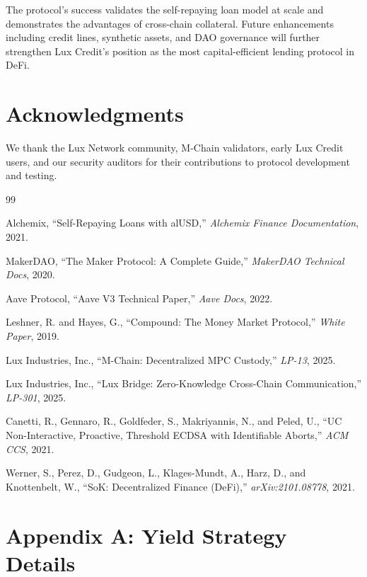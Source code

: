 \documentclass[11pt,a4paper]{article}
\begin{document}
The protocol's success validates the self-repaying loan model at scale and demonstrates the advantages of cross-chain collateral. Future enhancements including credit lines, synthetic assets, and DAO governance will further strengthen Lux Credit's position as the most capital-efficient lending protocol in DeFi.

\section*{Acknowledgments}

We thank the Lux Network community, M-Chain validators, early Lux Credit users, and our security auditors for their contributions to protocol development and testing.


\begin{thebibliography}{99}

Alchemix, ``Self-Repaying Loans with alUSD,'' \textit{Alchemix Finance Documentation}, 2021.

MakerDAO, ``The Maker Protocol: A Complete Guide,'' \textit{MakerDAO Technical Docs}, 2020.

Aave Protocol, ``Aave V3 Technical Paper,'' \textit{Aave Docs}, 2022.

Leshner, R. and Hayes, G., ``Compound: The Money Market Protocol,'' \textit{White Paper}, 2019.

Lux Industries, Inc., ``M-Chain: Decentralized MPC Custody,'' \textit{LP-13}, 2025.

Lux Industries, Inc., ``Lux Bridge: Zero-Knowledge Cross-Chain Communication,'' \textit{LP-301}, 2025.

Canetti, R., Gennaro, R., Goldfeder, S., Makriyannis, N., and Peled, U., ``UC Non-Interactive, Proactive, Threshold ECDSA with Identifiable Aborts,'' \textit{ACM CCS}, 2021.

Werner, S., Perez, D., Gudgeon, L., Klages-Mundt, A., Harz, D., and Knottenbelt, W., ``SoK: Decentralized Finance (DeFi),'' \textit{arXiv:2101.08778}, 2021.

\end{thebibliography}

\appendix

\section{Appendix A: Yield Strategy Details}
\end{document}

